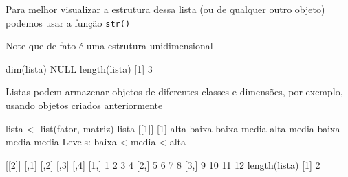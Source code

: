 \documentclass[
  10pt,
  a4paper]{book}
\newenvironment{Shaded}{\begin{snugshade}}{\end{snugshade}}
\newcommand{\ConstantTok}[1]{\textcolor[rgb]{0.00,0.00,0.00}{#1}}
\newcommand{\DecValTok}[1]{\textcolor[rgb]{0.00,0.00,0.81}{#1}}
\newcommand{\ErrorTok}[1]{\textcolor[rgb]{0.64,0.00,0.00}{\textbf{#1}}}
\newcommand{\FunctionTok}[1]{\textcolor[rgb]{0.00,0.00,0.00}{#1}}
\newcommand{\NormalTok}[1]{#1}
\newcommand{\OtherTok}[1]{\textcolor[rgb]{0.56,0.35,0.01}{#1}}
\newcommand{\SpecialCharTok}[1]{\textcolor[rgb]{0.00,0.00,0.00}{#1}}
\newcommand{\StringTok}[1]{\textcolor[rgb]{0.31,0.60,0.02}{#1}}
\begin{document}
Para melhor visualizar a estrutura dessa lista (ou de qualquer outro
objeto) podemos usar a função \texttt{str()}

\begin{Shaded}
\end{Shaded}

Note que de fato é uma estrutura unidimensional

\begin{Shaded}
\begin{Highlighting}[]
\FunctionTok{dim}\NormalTok{(lista)}
\ConstantTok{NULL}
\FunctionTok{length}\NormalTok{(lista)}
\NormalTok{[}\DecValTok{1}\NormalTok{] }\DecValTok{3}
\end{Highlighting}
\end{Shaded}

Listas podem armazenar objetos de diferentes classes e dimensões, por
exemplo, usando objetos criados anteriormente

\begin{Shaded}
\begin{Highlighting}[]
\NormalTok{lista }\OtherTok{\textless{}{-}} \FunctionTok{list}\NormalTok{(fator, matriz)}
\NormalTok{lista}
\NormalTok{[[}\DecValTok{1}\NormalTok{]]}
\NormalTok{[}\DecValTok{1}\NormalTok{] alta  baixa baixa media alta  media baixa media media}
\NormalTok{Levels}\SpecialCharTok{:}\NormalTok{ baixa }\SpecialCharTok{\textless{}}\NormalTok{ media }\SpecialCharTok{\textless{}}\NormalTok{ alta}

\NormalTok{[[}\DecValTok{2}\NormalTok{]]}
\NormalTok{     [,}\DecValTok{1}\NormalTok{] [,}\DecValTok{2}\NormalTok{] [,}\DecValTok{3}\NormalTok{] [,}\DecValTok{4}\NormalTok{]}
\NormalTok{[}\DecValTok{1}\NormalTok{,]    }\DecValTok{1}    \DecValTok{2}    \DecValTok{3}    \DecValTok{4}
\NormalTok{[}\DecValTok{2}\NormalTok{,]    }\DecValTok{5}    \DecValTok{6}    \DecValTok{7}    \DecValTok{8}
\NormalTok{[}\DecValTok{3}\NormalTok{,]    }\DecValTok{9}   \DecValTok{10}   \DecValTok{11}   \DecValTok{12}
\FunctionTok{length}\NormalTok{(lista)}
\NormalTok{[}\DecValTok{1}\NormalTok{] }\DecValTok{2}
\end{Highlighting}
\end{Shaded}
\end{document}
